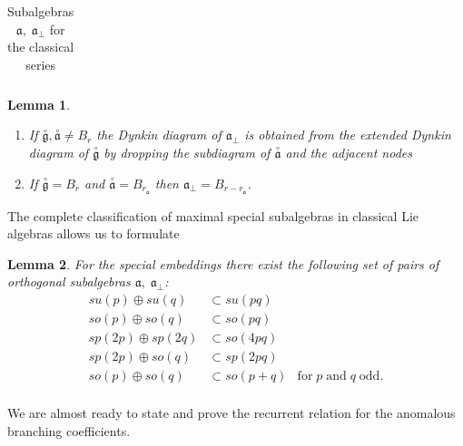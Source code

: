 \documentclass[12pt]{iopart}
\newtheorem{lemma}{Lemma}
\theoremstyle{definition}
\theoremstyle{definition}
\theoremstyle{definition}
\newcommand{\go}{\stackrel{\circ }{\mathfrak{g}}}
\newcommand{\ao}{\stackrel{\circ }{\mathfrak{a}}}
\begin{document}
\begin{table}[h!tb]
{\begin{tabular}{|l|l|l|l|}
  \hline
\end{tabular}
\caption{Subalgebras $\mathfrak{a},\; \mathfrak{a}_{\bot}$ for the classical series}}
\end{table}

\begin{lemma}
  \renewcommand{\theenumi}{\alph{enumi}}
  \begin{enumerate}
  \item If $\go,\ao\neq B_r$ the Dynkin diagram of $\mathfrak{a}_{\bot}$ is obtained from the extended Dynkin diagram of $\go$ by dropping the subdiagram of $\ao$ and the adjacent nodes
  \item If $\go=B_r$ and $\ao=B_{r_{\mathfrak{a}}}$ then $\mathfrak{a}_{\bot}=B_{r-r_{\mathfrak{a}}}$.
  \end{enumerate}
\end{lemma}
The complete classification of maximal special subalgebras in classical Lie algebras
\cite{dynkin1952semisimple} allows us to formulate
\begin{lemma}
  For the special embeddings there exist the following set of pairs of orthogonal subalgebras $\mathfrak{a},\;\mathfrak{a}_{\bot}$:
\begin{equation*}
  \begin{array}{lll}
      su(p)\oplus su(q) & \subset su(pq) &\\
      so(p)\oplus so(q) & \subset so(pq) &\\
      sp(2p)\oplus sp(2q) & \subset so(4pq)&\\
      sp(2p)\oplus so(q) & \subset sp(2pq)&\\
      so(p)\oplus so(q) & \subset so(p+q)& \mbox{for}\;p\;\mbox{and}\;q\;\mbox{odd}.\\
  \end{array}
\end{equation*}
\end{lemma}
We are almost ready to state and prove the recurrent relation for the anomalous branching coefficients.
\end{document}
